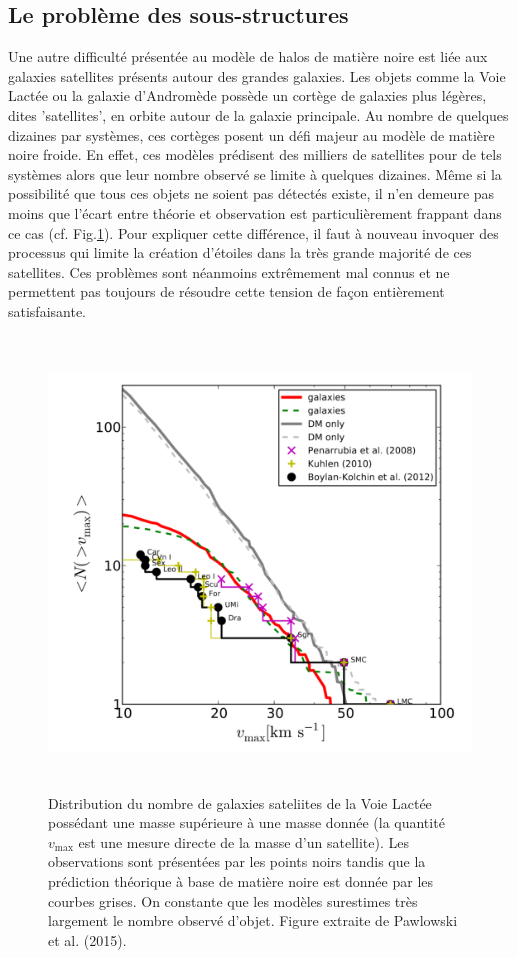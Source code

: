 \subsection{Le problème des sous-structures}
Une autre difficulté présentée au modèle de halos de matière noire est liée aux galaxies satellites présents autour des grandes galaxies. Les objets comme la Voie Lactée ou la galaxie d'Andromède possède un cortège de galaxies plus légères, dites 'satellites', en orbite autour de la galaxie principale. Au nombre de quelques dizaines par systèmes, ces cortèges posent un défi majeur au modèle de matière noire froide. En effet, ces modèles prédisent des milliers de satellites pour de tels systèmes alors que leur nombre observé se limite à quelques dizaines. Même si la possibilité que tous ces objets ne soient pas détectés existe, il n'en demeure pas moins que l'écart entre théorie et observation est particulièrement frappant dans ce cas (cf. Fig.\ref{f:missing}). Pour expliquer cette différence, il faut à nouveau invoquer des processus qui limite la création d'étoiles dans la très grande majorité de ces satellites. Ces problèmes sont néanmoins extrêmement mal connus et ne permettent pas toujours de résoudre cette tension de façon entièrement satisfaisante.
\begin{figure}[htbp]
	\centering
		\includegraphics[height=12cm]{figs/missing.png}
	\caption[Distribution du nombre de galaxies sateliites de la Voie Lactée]{Distribution du nombre de galaxies sateliites de la Voie Lactée possédant une masse supérieure à une masse donnée (la quantité $v_\mathrm{max}$ est une mesure directe de la masse d'un satellite). Les observations sont présentées par les points noirs tandis que la prédiction théorique à base de matière noire est donnée par les courbes grises. On constante que les modèles surestimes très largement le nombre observé d'objet. Figure extraite de Pawlowski et al. (2015). } 
	\label{f:missing}
\end{figure}

